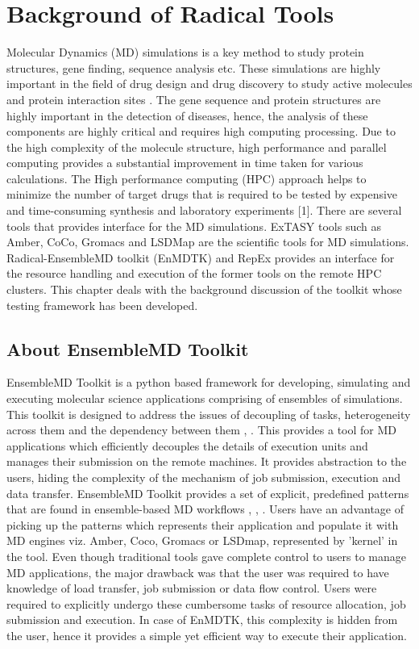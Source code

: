 \documentclass[10pt]{ruthesis}
\begin{document}
\chapter{Background of Radical Tools}
\label{chap:background}
Molecular Dynamics (MD) simulations is a key method to study protein structures, gene finding, sequence analysis etc. These simulations are highly important in the field of drug design and drug discovery to study active molecules and protein interaction sites \cite{ref1}. The gene sequence and protein structures are highly important in the detection of diseases, hence, the analysis of these components are highly critical and requires high computing processing. Due to the high complexity of the molecule structure, high performance and parallel computing provides a substantial improvement in time taken for various calculations. The High performance computing (HPC) approach helps to minimize the number of target drugs that is required to be tested by expensive and time-consuming synthesis and laboratory experiments [1]. There are several tools that provides interface for the MD simulations. ExTASY tools such as Amber, CoCo, Gromacs and LSDMap are the scientific tools for MD simulations. Radical-EnsembleMD toolkit (EnMDTK) and RepEx provides an interface for the resource handling and execution of the former tools on the remote HPC clusters. This chapter deals with the background discussion of the toolkit whose testing framework has been developed.

\section{About EnsembleMD Toolkit}
EnsembleMD Toolkit is a python based framework for developing, simulating and executing molecular science applications comprising of ensembles of simulations. This toolkit is designed to address the issues of decoupling of tasks, heterogeneity across them and the dependency between them \cite{ref3}, \cite{site1}. This provides a tool for MD applications which efficiently decouples the details of execution units and manages their submission on the remote machines. It provides abstraction to the users, hiding the complexity of the mechanism of job submission, execution and data transfer. EnsembleMD Toolkit provides a set of explicit, predefined patterns that are found in ensemble-based MD workflows \cite{ref2}, \cite{ref3}, \cite{site1} . Users have an advantage of picking up the patterns which represents their application and populate it with MD engines viz. Amber, Coco, Gromacs or LSDmap, represented by 'kernel' in the tool. Even though traditional tools gave complete control to users to manage MD applications, the major drawback was that the user was required to have knowledge of load transfer, job submission or data flow control. Users were required to explicitly undergo these cumbersome tasks of resource allocation, job submission and execution. In case of EnMDTK, this complexity is hidden from the user, hence it provides a simple yet efficient way to execute their application.
\end{document}
